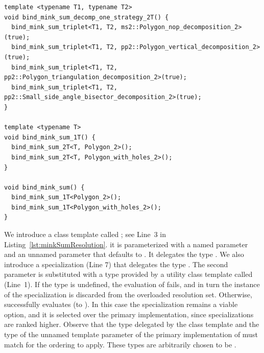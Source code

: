 \begin{lstfloat}
  \begin{lstlisting}[style=cppframedStyle,basicstyle=\normalsize,%
                     label={lst:minkowskiSumExpansion},%
                     caption={Automatic generation of calls
                     \cppLstinline{minkowski_sum_triplet<PT1, PT2, PP>(true)}.}]
template <typename T1, typename T2>
void bind_mink_sum_decomp_one_strategy_2T() {
  bind_mink_sum_triplet<T1, T2, ms2::Polygon_nop_decomposition_2>(true);
  bind_mink_sum_triplet<T1, T2, pp2::Polygon_vertical_decomposition_2>(true);
  bind_mink_sum_triplet<T1, T2, pp2::Polygon_triangulation_decomposition_2>(true);
  bind_mink_sum_triplet<T1, T2, pp2::Small_side_angle_bisector_decomposition_2>(true);
}

template <typename T>
void bind_mink_sum_1T() {
  bind_mink_sum_2T<T, Polygon_2>();
  bind_mink_sum_2T<T, Polygon_with_holes_2>();
}

void bind_mink_sum() {
  bind_mink_sum_1T<Polygon_2>();
  bind_mink_sum_1T<Polygon_with_holes_2>();
}
  \end{lstlisting}
\end{lstfloat}

We introduce a class template called ; see
Line~3 in Listing~\ref{lst:minkSumResolution}. it is parameterized with a
named parameter  and an unnamed parameter that
defaults to . It delegates the type
. We also introduce a
specialization (Line 7) that delegates the type
. The second parameter
is substituted with a type provided by a utility class template called
 (Line~1). If the type 
is undefined, the evaluation of 
fails, and in turn the instance of the 
specialization is discarded from the overloaded resolution
set. Otherwise,  successfully
evaluates (to ). In this case the
 specialization remains a viable option, and it
is selected over the primary implementation, since specializations are
ranked higher. Observe that the type delegated by the
 class template and the type of the unnamed
template parameter of the primary implementation of
 must match for the ordering to apply. These
types are arbitrarily chosen to be .
%


